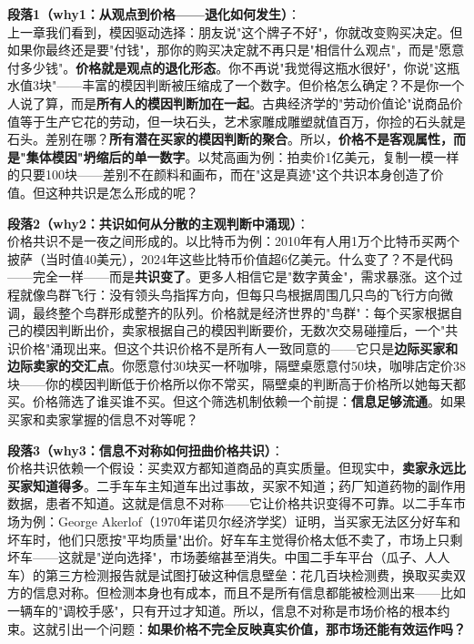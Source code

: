 \documentclass[../main.tex]{subfiles}
\begin{document}
	\textbf{段落1（why1：从观点到价格——退化如何发生）}：\\
	上一章我们看到，模因驱动选择：朋友说"这个牌子不好"，你就改变购买决定。但如果你最终还是要"付钱"，那你的购买决定就不再只是"相信什么观点"，而是"愿意付多少钱"。\textbf{价格就是观点的退化形态}。你不再说"我觉得这瓶水很好"，你说"这瓶水值3块"——丰富的模因判断被压缩成了一个数字。但价格怎么确定？不是你一个人说了算，而是\textbf{所有人的模因判断加在一起}。古典经济学的"劳动价值论"说商品价值等于生产它花的劳动，但一块石头，艺术家雕成雕塑就值百万，你捡的石头就是石头。差别在哪？\textbf{所有潜在买家的模因判断的聚合}。所以，\textbf{价格不是客观属性，而是"集体模因"坍缩后的单一数字}。以梵高画为例：拍卖价1亿美元，复制一模一样的只要100块——差别不在颜料和画布，而在"这是真迹"这个共识本身创造了价值。但这种共识是怎么形成的呢？

	\textbf{段落2（why2：共识如何从分散的主观判断中涌现）}：\\
	价格共识不是一夜之间形成的。以比特币为例：2010年有人用1万个比特币买两个披萨（当时值40美元），2024年这些比特币价值超6亿美元。什么变了？不是代码——完全一样——而是\textbf{共识变了}。更多人相信它是"数字黄金"，需求暴涨。这个过程就像鸟群飞行：没有领头鸟指挥方向，但每只鸟根据周围几只鸟的飞行方向微调，最终整个鸟群形成整齐的队列。价格就是经济世界的"鸟群"：每个买家根据自己的模因判断出价，卖家根据自己的模因判断要价，无数次交易碰撞后，一个"共识价格"涌现出来。但这个共识价格不是所有人一致同意的——它只是\textbf{边际买家和边际卖家的交汇点}。你愿意付30块买一杯咖啡，隔壁桌愿意付50块，咖啡店定价38块——你的模因判断低于价格所以你不常买，隔壁桌的判断高于价格所以她每天都买。价格筛选了谁买谁不买。但这个筛选机制依赖一个前提：\textbf{信息足够流通}。如果买家和卖家掌握的信息不对等呢？

	\textbf{段落3（why3：信息不对称如何扭曲价格共识）}：\\
	价格共识依赖一个假设：买卖双方都知道商品的真实质量。但现实中，\textbf{卖家永远比买家知道得多}。二手车车主知道车出过事故，买家不知道；药厂知道药物的副作用数据，患者不知道。这就是信息不对称——它让价格共识变得不可靠。以二手车市场为例：George Akerlof（1970年诺贝尔经济学奖）证明，当买家无法区分好车和坏车时，他们只愿按"平均质量"出价。好车车主觉得价格太低不卖了，市场上只剩坏车——这就是"逆向选择"，市场萎缩甚至消失。中国二手车平台（瓜子、人人车）的第三方检测报告就是试图打破这种信息壁垒：花几百块检测费，换取买卖双方的信息对称。但检测本身也有成本，而且不是所有信息都能被检测出来——比如一辆车的"调校手感"，只有开过才知道。所以，信息不对称是市场价格的根本约束。这就引出一个问题：\textbf{如果价格不完全反映真实价值，那市场还能有效运作吗？}
\end{document}
